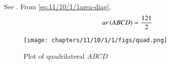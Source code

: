 See .
    From 
        \eqref{eq:11/10/1/1area-diag},
    \begin{align}
ar\left(ABCD\right)
	       = \frac{121}{2}
        \label{eq:11/10/1/1ans}
    \end{align}
    \begin{figure}[H]
        \centering
        \texttt{[image: chapters/11/10/1/1/figs/quad.png]}
        \caption{Plot of quadrilateral $ABCD$}
        \label{fig:11/10/1/1quad}
    \end{figure}
